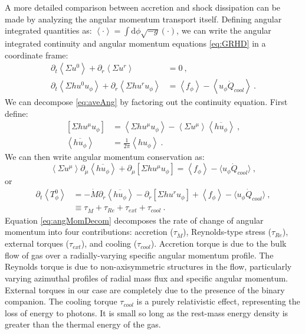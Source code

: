 \documentclass{emulateapj}
\newcommand{\Sig}{\Sigma}
\newcommand{\dd}{\mbox{d}}
\newcommand{\ave}[1]{\left \langle #1 \right \rangle}
\newcommand{\aveRe}[1]{\left [ #1 \right ]}
\begin{document}
A more detailed comparison between accretion and shock dissipation can be made by analyzing the angular momentum transport itself.  Defining angular integrated quantities as: $\ave{\cdot} = \int \dd \phi \sqrt{-g} (\cdot)$, we can write the angular integrated continuity and angular momentum equations \eqref{eq:GRHD} in a coordinate frame:
\begin{align}
	\partial_t \ave{\Sig u^0} + \partial_r \ave{\Sig u^r} &= 0 \ ,\label{eq:aveAng}\\
	\partial_t \ave{\Sig h u^0 u_\phi} + \partial_r \ave{\Sig h u^r u_\phi} &= \ave{f_\phi}- \ave{u_\phi \dot{Q}_{cool}} \ .\nonumber
\end{align} 
We can decompose \eqref{eq:aveAng} by factoring out the continuity equation.  First define:
\begin{align*}
	\aveRe{\Sig h u^\mu u_\phi} &= \ave{\Sig h u^\mu u_\phi} - \ave{\Sig u^\mu}\ave{\overline{h u_\phi}} \ , \\
	\ave{\overline{h u_\phi}} &= \frac{1}{2\pi} \ave{h u_\phi} \ .
\end{align*}
We can then write angular momentum conservation as:
\begin{equation}
	\ave{\Sig u^\mu} \partial_\mu \ave{\overline{h u_\phi}} + \partial_\mu \aveRe{\Sig h u^\mu u_\phi} =  \ave{f_\phi}- \langle u_\phi \dot{Q}_{cool} \rangle \ , 
\end{equation}
or
\begin{align}
	\partial_t \ave{T^0_\phi} &= -\dot{M} \partial_r \ave{\overline{h u_\phi}} -  \partial_r \aveRe{\Sig h u^r u_\phi} +  \ave{f_\phi}- \langle u_\phi \dot{Q}_{cool} \rangle \ , \nonumber \\
	&\equiv \tau_{\dot{M}} + \tau_{Re} + \tau_{ext} + \tau_{cool} \ . \label{eq:angMomDecom}
\end{align} 
Equation \eqref{eq:angMomDecom} decomposes the rate of change of angular momentum into four contributions: accretion ($\tau_{\dot{M}}$), Reynolds-type stress ($\tau_{Re}$), external torques ($\tau_{ext}$), and cooling ($\tau_{cool}$).  Accretion torque is due to the bulk flow of gas over a radially-varying specific angular momentum profile. The Reynolds torque is due to non-axisymmetric structures in the flow, particularly varying azimuthal profiles of radial mass flux and specific angular momentum. External torques in our case are completely due to the presence of the binary companion. The cooling torque $\tau_{cool}$ is a purely relativistic effect, representing the loss of energy to photons. It is small so long as the rest-mass energy density is greater than the thermal energy of the gas.
\end{document}
